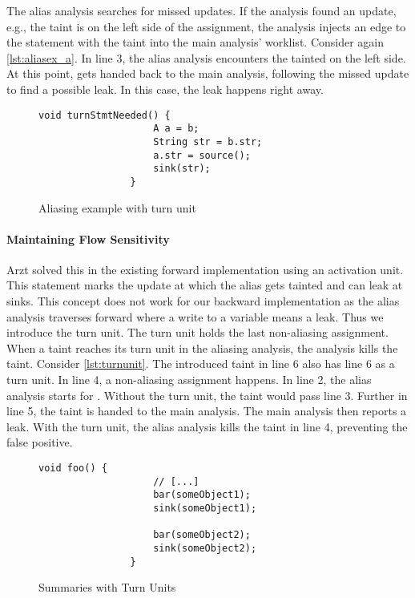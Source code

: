 \documentclass[../draft.tex]{subfiles}
\begin{document}
    The alias analysis searches for missed updates. If the analysis found an update, e.g., the taint is on the left side of the assignment, the analysis injects an edge to the statement with the taint into the main analysis' worklist. Consider again \autoref{lst:aliasex_a}. In line 3, the alias analysis encounters the tainted  on the left side. At this point,  gets handed back to the main analysis, following the missed update to find a possible leak. In this case, the leak happens right away.

    \begin{figure}[ht]
        \centering
        \begin{adjustbox}{max width=\columnwidth}
            \begin{lstlisting}[gobble=16]
                void turnStmtNeeded() {
                    A a = b;
                    String str = b.str;
                    a.str = source();
                    sink(str);
                }
            \end{lstlisting}
        \end{adjustbox}
        \caption{Aliasing example with turn unit}
        \label{lst:turnunit}
    \end{figure}

    \paragraph{Maintaining Flow Sensitivity}
    Arzt solved this in the existing forward implementation using an activation unit. This statement marks the update at which the alias gets tainted and can leak at sinks. This concept does not work for our backward implementation as the alias analysis traverses forward where a write to a variable means a leak. Thus we introduce the turn unit. The turn unit holds the last non-aliasing assignment. When a taint reaches its turn unit in the aliasing analysis, the analysis kills the taint. Consider \autoref{lst:turnunit}. The introduced taint  in line 6 also has line 6 as a turn unit. In line 4, a non-aliasing assignment happens. In line 2, the alias analysis starts for . Without the turn unit, the taint would pass line 3. Further in line 5, the taint is handed to the main analysis. The main analysis then reports a leak. With the turn unit, the alias analysis kills the taint in line 4, preventing the false positive. 
    
    \begin{figure}[ht]
        \centering
        \begin{adjustbox}{max width=\columnwidth}
            \begin{lstlisting}[gobble=16]
                void foo() {
                    // [...]
                    bar(someObject1);
                    sink(someObject1);

                    bar(someObject2);
                    sink(someObject2);
                }
            \end{lstlisting}
        \end{adjustbox}
        \caption{Summaries with Turn Units}
        \label{lst:turnunitsum}
    \end{figure}
\end{document}

